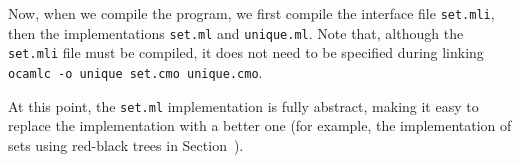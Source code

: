%
%
Now, when we compile the program, we first compile the interface
file \hbox{\lstinline/set.mli/}, then the
implementations \hbox{\lstinline/set.ml/}
and \hbox{\lstinline/unique.ml/}.
%
%
%
Note that, although the \hbox{\lstinline/set.mli/} file must be compiled, it does not
need to be specified during linking
%
\hbox{\lstinline/ocamlc -o unique set.cmo unique.cmo/}.

At this point, the \hbox{\lstinline/set.ml/} implementation is fully
abstract, making it easy to replace the implementation with a better
one (for example, the implementation of sets using red-black trees in
Section~).


